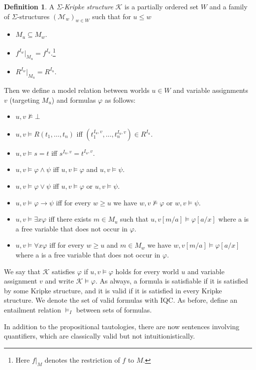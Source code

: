 \documentclass[a4paper,11pt]{report}
\theoremstyle{definition}
\theoremstyle{definition}
\theoremstyle{definition}
\theoremstyle{definition}
\theoremstyle{definition}
\newtheorem{definition}[theorem]{Definition}
\theoremstyle{definition}
\theoremstyle{definition}
\begin{document}
	\begin{definition}
		A $\Sigma$-\textit{Kripke structure} $\mathcal{K}$ is a partially ordered set $W$ and a family of $\Sigma$-structures $(\mathcal{M}_w)_{w\in W}$ such that for $u\leq w$
		\begin{itemize}
			\item $M_u\subseteq M_w$.
			\item $f^{I_w}|_{M_u} = f^{I_u}$.\footnote{Here $f|_M$ denotes the restriction of $f$ to $M$.}
			\item $R^{I_w}|_{M_u} = R^{I_u}$.
		\end{itemize}
		Then we define a model relation between worlds $u\in W$ and variable assignments $v$ (targeting $M_u$) and formulas $\varphi$ as follows:
		\begin{itemize}
			\item $u, v\not\models\bot$
			\item $u, v\models R(t_1,\dots,t_n)$ iff $(t_1^{I_u, v},\dots,t_n^{I_u, v})\in R^{I_u}$.
			\item $u, v\models s = t$ iff $s^{I_u, v} = t^{I_u, v}$.
			\item $u, v\models \varphi\wedge \psi$ iff $u, v\models\varphi$ and $u, v\models\psi$.
			\item $u, v\models \varphi\vee\psi$ iff $u, v\models\varphi$ or $u, v\models\psi$.
			\item $u, v\models \varphi\to\psi$ iff for every $w\geq u$ we have $w, v\not\models\varphi$ or $w, v\models\psi$.
			\item $u, v\models\exists x\varphi$ iff there exists $m\in M_u$ such that $u, v[m/a]\models\varphi[a/x]$ where a is a free variable that does not occur in $\varphi$.
			\item $u, v\models\forall x\varphi$ iff for every $w\geq u$ and $m\in M_w$ we have $w, v[m/a]\models\varphi[a/x]$ where a is a free variable that does not occur in $\varphi$.
		\end{itemize}
		We say that $\mathcal{K}$ satisfies $\varphi$ if $u, v\models\varphi$ holds for every world $u$ and variable assignment $v$ and write $\mathcal K\models\varphi$. As always, a formula is satisfiable if it is satisfied by some Kripke structure, and it is valid if it is satisfied in every Kripke structure. We denote the set of valid formulas with IQC.  As before, define an entailment relation $\models_I$ between sets of formulas.
	\end{definition}
	In addition to the propositional tautologies, there are now sentences involving quantifiers, which are classically valid but not intuitionistically.
\end{document}
